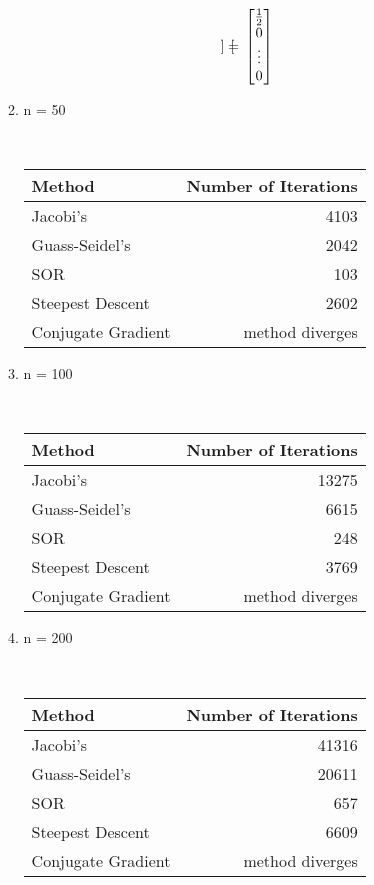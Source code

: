 \documentclass[letterpaper,12pt]{article}
\begin{document}
\begin{enumerate}
\begin{enumerate}
\[\begin{bmatrix}
\end{bmatrix}
=
\\ \begin{bmatrix}
\frac{1}{2}\\
0\\
\vdots\\
0 \\

\end{bmatrix}
\]


 
 
\item n = 50
\begin{center}
\\\begin{tabular}{|l|r|}
\hline
\textbf{Method}  & \textbf{Number of Iterations}\\ \hline
Jacobi's & 4103\\ \hline
Guass-Seidel's & 2042  \\ \hline
SOR & 103 \\\hline
Steepest Descent & 2602 \\ \hline
Conjugate Gradient & method diverges\\ \hline
\end{tabular}
\end{center}
\item n = 100
\begin{center}
\\\begin{tabular}{|l|r|}
\hline
\textbf{Method}  & \textbf{Number of Iterations}\\ \hline
Jacobi's & 13275\\ \hline
Guass-Seidel's & 6615  \\ \hline
SOR & 248 \\\hline
Steepest Descent & 3769 \\ \hline
Conjugate Gradient & method diverges\\ \hline
\end{tabular}
\end{center}
\item n = 200
\begin{center}
\\\begin{tabular}{|l|r|}
\hline
\textbf{Method}  & \textbf{Number of Iterations}\\ \hline
Jacobi's & 41316\\ \hline
Guass-Seidel's & 20611  \\ \hline
SOR & 657 \\\hline
Steepest Descent & 6609 \\ \hline
Conjugate Gradient & method diverges\\ \hline
\end{tabular}
\end{center}



\end{enumerate}
\end{enumerate}
\end{document}
